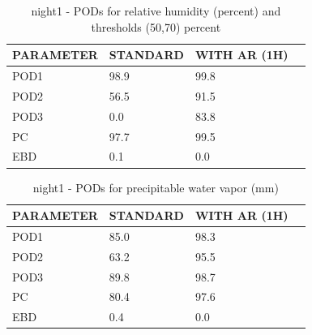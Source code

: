 \begin{table}[p!]
\begin{center}
\begin{tabular}{|l|l|l|l|}
\hline
\multicolumn{1}{|c|}{\cellcolor[HTML]{C0C0C0}\textbf{PARAMETER}} & \multicolumn{1}{c|}{\cellcolor[HTML]{C0C0C0}\textbf{STANDARD}} & \multicolumn{1}{c|}{\cellcolor[HTML]{C0C0C0}\textbf{WITH AR (1H)}} \\
\hline
\cellcolor[HTML]{C0C0C0}POD1  & 98.9                                & 99.8         \\
\cellcolor[HTML]{C0C0C0}POD2  & 56.5                                & 91.5         \\
\cellcolor[HTML]{C0C0C0}POD3  & 0.0                                & 83.8         \\
\cellcolor[HTML]{C0C0C0}PC    & 97.7                                & 99.5           \\
\cellcolor[HTML]{C0C0C0}EBD   & 0.1                                & 0.0          \\
\hline
\end{tabular}
\caption{night1 - PODs for relative humidity (percent) and thresholds (50,70) percent}
\label{tab:podrhFT:night1}
\end{center}
\end{table}
\begin{table}[p!]
\begin{center}
\begin{tabular}{|l|l|l|l|}
\hline
\multicolumn{1}{|c|}{\cellcolor[HTML]{C0C0C0}\textbf{PARAMETER}} & \multicolumn{1}{c|}{\cellcolor[HTML]{C0C0C0}\textbf{STANDARD}} & \multicolumn{1}{c|}{\cellcolor[HTML]{C0C0C0}\textbf{WITH AR (1H)}} \\
\hline
\cellcolor[HTML]{C0C0C0}POD1  & 85.0                                & 98.3         \\
\cellcolor[HTML]{C0C0C0}POD2  & 63.2                                & 95.5         \\
\cellcolor[HTML]{C0C0C0}POD3  & 89.8                                & 98.7         \\
\cellcolor[HTML]{C0C0C0}PC    & 80.4                                  & 97.6           \\
\cellcolor[HTML]{C0C0C0}EBD   & 0.4                                 & 0.0          \\
\hline
\end{tabular}
\caption{night1 - PODs for precipitable water vapor (mm)}
\label{tab:podpwv:night1}
\end{center}
\end{table}
